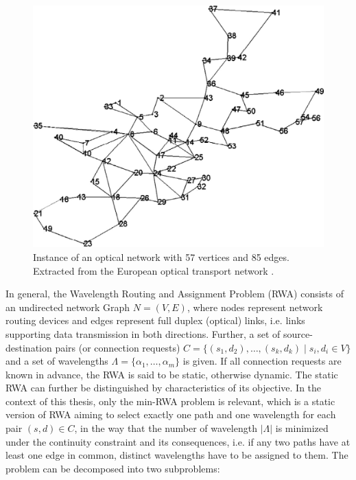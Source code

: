 \begin{figure}
\begin{center}
\includegraphics[scale=0.2]{figures/rwa.png}
\caption{Instance of an optical network with 57 vertices and 85 edges. Extracted from the European optical transport network \cite{belgacem-13}.}
\label{pd:opticalNetwork}
\end{center}
\end{figure}
  
In general, the Wavelength Routing and Assignment Problem (RWA) consists of an undirected network Graph $N=(V,E)$, where nodes represent network routing devices and edges represent full duplex (optical) links, i.e. links supporting data transmission in both directions. Further, a set of source-destination pairs (or connection requests) $C=\{(s_1,d_2),\ldots , (s_k, d_k) \mid s_i,d_i \in V\}$ and a set of wavelengths $\Lambda = \{\alpha_1 , \ldots, \alpha_m \}$ is given. If all connection requests are known in advance, the RWA is said to be static, otherwise dynamic\cite{murthy-02}. The static RWA can further be distinguished by characteristics of its objective. In the context of this thesis, only the min-RWA problem is relevant, which is a static version of RWA aiming to select exactly one path and one wavelength for each pair $(s,d) \in C$, in the way that the number of wavelength $\left\vert{\Lambda}\right\vert$ is minimized under the continuity constraint and its consequences, i.e. if any two paths have at least one edge in common, distinct wavelengths have to be assigned to them. The problem can be decomposed into two subproblems:

